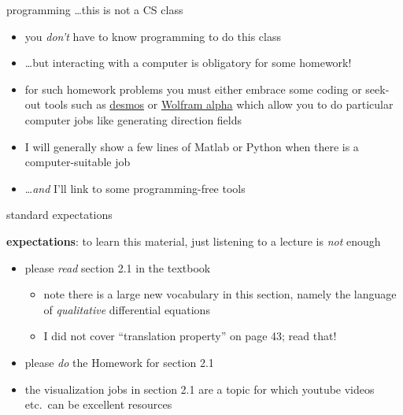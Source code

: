 \documentclass[colorlinks]{beamer}
\begin{document}
\begin{frame}{programming \dots this is not a CS class}

\begin{itemize}
\item you \emph{don't} have to know programming to do this class
\item \dots but \alert{interacting with a computer is obligatory for some homework!}
\item for such homework problems you must either embrace some coding or seek-out tools such as \href{https://www.desmos.com/}{\color{cyan} desmos} or \href{https://www.wolframalpha.com/}{\color{cyan} Wolfram alpha} which allow you to do particular computer jobs like generating direction fields
\item I will generally show a few lines of Matlab or Python when there is a computer-suitable job
\item \dots \emph{and} I'll link to some programming-free tools
\end{itemize}
\end{frame}


\begin{frame}{standard expectations}

\textbf{expectations}:  to learn this material, just listening to a lecture is \emph{not} enough
\begin{itemize}
\item please \alert{\emph{read} section 2.1 in the textbook}
    \begin{itemize}
    \item note there is a large new vocabulary in this section, namely the language of \emph{qualitative} differential equations
    \item I did not cover ``translation property'' on page 43; read that!
    \end{itemize}
\item please \alert{\emph{do} the Homework for section 2.1}
\item the visualization jobs in section 2.1 are a topic for which youtube videos etc.~can be excellent resources
\end{itemize}
\end{frame}
\end{document}
